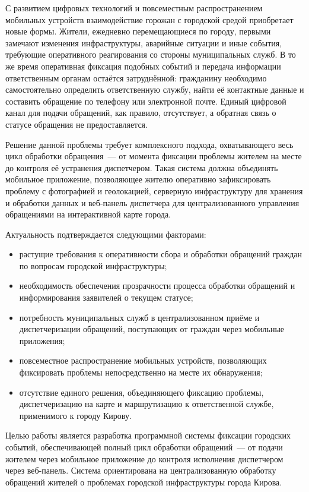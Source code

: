 С развитием цифровых технологий и повсеместным распространением мобильных устройств
взаимодействие горожан с городской средой приобретает новые формы.
Жители, ежедневно перемещающиеся по городу, первыми замечают изменения инфраструктуры,
аварийные ситуации и иные события, требующие оперативного реагирования со стороны
муниципальных служб. В то же время оперативная фиксация подобных событий и передача
информации ответственным органам остаётся затруднённой: гражданину необходимо
самостоятельно определить ответственную службу, найти её контактные данные и составить
обращение по телефону или электронной почте. Единый цифровой канал для подачи обращений,
как правило, отсутствует, а обратная связь о статусе обращения не предоставляется.

Решение данной проблемы требует комплексного подхода, охватывающего весь цикл
обработки обращения~--- от момента фиксации проблемы жителем на месте до контроля
её устранения диспетчером. Такая система должна объединять мобильное приложение,
позволяющее жителю оперативно зафиксировать проблему с фотографией и геолокацией,
серверную инфраструктуру для хранения и обработки данных и веб-панель диспетчера
для централизованного управления обращениями на интерактивной карте города.

Актуальность подтверждается следующими факторами:
\begin{itemize}
    \item растущие требования к оперативности сбора и обработки обращений граждан
          по вопросам городской инфраструктуры;
    \item необходимость обеспечения прозрачности процесса обработки обращений и
          информирования заявителей о текущем статусе;
    \item потребность муниципальных служб в централизованном приёме и диспетчеризации
          обращений, поступающих от граждан через мобильные приложения;
    \item повсеместное распространение мобильных устройств, позволяющих фиксировать
          проблемы непосредственно на месте их обнаружения;
    \item отсутствие единого решения, объединяющего фиксацию проблемы, диспетчеризацию
          на карте и маршрутизацию к ответственной службе, применимого к городу Кирову.
\end{itemize}

Целью работы является разработка программной системы фиксации городских событий,
обеспечивающей полный цикл обработки обращений~--- от подачи жителем через мобильное
приложение до контроля исполнения диспетчером через веб-панель. Система ориентирована
на централизованную обработку обращений жителей о проблемах городской инфраструктуры
города Кирова.

